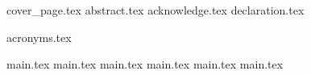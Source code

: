 \documentclass[oneside]{report}
\begin{document}
{cover_page.tex}
\setcounter{page}{2}
{abstract.tex}
{acknowledge.tex}
{declaration.tex}

\renewcommand{\contentsname}{Table of Contents}
\tableofcontents

{acronyms.tex}

\listoffigures
\clearpage
\listoftables
\clearpage

\setcounter{page}{1}
{main.tex}
{main.tex}
{main.tex}
{main.tex}
{main.tex}
{main.tex}

\cleardoublepage
{}
{}
\renewcommand{\bibname}{References}


\end{document}

